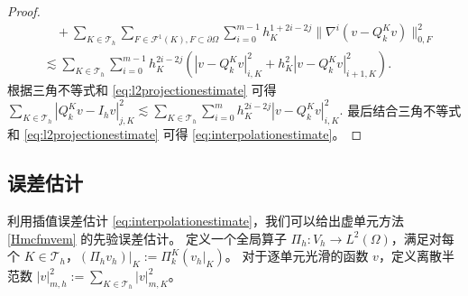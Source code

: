 \begin{proof}
\begin{align*}
&\quad +  \sum_{K\in\mathcal T_h}\sum_{F\in\mathcal F^{1}(K), F\subset\partial\Omega}\sum_{i=0}^{m-1}h_K^{1+2i-2j}\|\nabla^i(v-Q_k^Kv)\|_{0,F}^2 \\
&\lesssim  \sum_{K\in\mathcal T_h}\sum_{i=0}^{m-1}h_K^{2i-2j}(|v-Q_k^Kv|_{i,K}^2+h_K^2|v-Q_k^Kv|_{i+1,K}^2).
\end{align*}
根据三角不等式和 \eqref{eq:l2projectionestimate} 可得
$\displaystyle
\sum_{K\in\mathcal T_h}|Q_k^Kv-I_hv|_{j,K}^2\lesssim \sum_{K\in\mathcal T_h}\sum_{i=0}^{m}h_K^{2i-2j}|v-Q_k^Kv|_{i,K}^2.
$
最后结合三角不等式和 \eqref{eq:l2projectionestimate} 
可得 \eqref{eq:interpolationestimate}。
\end{proof}

\subsection{误差估计}

利用插值误差估计 \eqref{eq:interpolationestimate}，我们可以给出虚单元方法 \eqref{Hmcfmvem} 的先验误差估计。
定义一个全局算子 $\Pi_h: V_h\to L^2(\Omega)$，满足对每个 $K\in\mathcal T_h$，$(\Pi_hv_h)|_K:=\Pi_k^K(v_h|_K)$。
对于逐单元光滑的函数 $v$，定义离散半范数
$\displaystyle
|v|_{m,h}^2:=\sum_{K\in\mathcal T_h}|v|_{m,K}^2。
$


